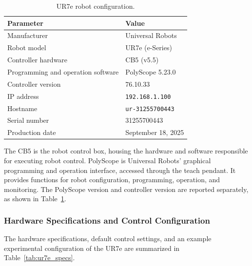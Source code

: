 \documentclass[11pt,a4paper]{article}
\begin{document}
\begin{table}[htbp]
\centering
\caption{UR7e robot configuration.}
\label{tab:ur7e_config}
\begin{tabular}{ll}
\toprule
\textbf{Parameter} & \textbf{Value} \\
\midrule
Manufacturer & Universal Robots \\
Robot model & UR7e (e-Series) \\
Controller hardware & CB5 (v5.5) \\
Programming and operation software & PolyScope 5.23.0 \\
Controller version & 76.10.33 \\
IP address & \texttt{192.168.1.100} \\
Hostname & \texttt{ur-31255700443} \\
Serial number & 31255700443 \\
Production date & September 18, 2025 \\
\bottomrule
\end{tabular}
\end{table}


The CB5 is the robot control box, housing the hardware and software responsible for executing robot control. PolyScope is Universal Robots' graphical programming and operation interface, accessed through the teach pendant. It provides functions for robot configuration, programming, operation, and monitoring. The PolyScope version and controller version are reported separately, as shown in Table~\ref{tab:ur7e_config}.


\subsubsection{Hardware Specifications and Control Configuration}

The hardware specifications, default control settings, and an example experimental configuration of the UR7e are summarized in Table~\ref{tab:ur7e_specs}.
\end{document}
